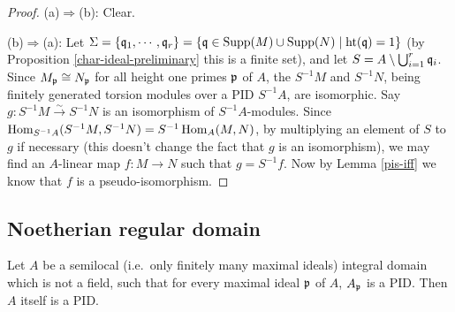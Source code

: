 \begin{proof}
(a)$\Rightarrow$(b): Clear.

(b)$\Rightarrow$(a): Let $\Sigma=\{{\mathfrak{q}}_1,\cdots,{\mathfrak{q}}_r\}
=\{{\mathfrak{q}}\in{\mathrm{Supp}}(M)\cup{\mathrm{Supp}}(N)\mid{\mathrm{ht}}({\mathfrak{q}})=1\}$
(by Proposition \ref{char-ideal-preliminary} this is a finite set),
and let $S=A\setminus\bigcup_{i=1}^r{\mathfrak{q}}_i$.
Since $M_{\mathfrak{p}}\cong N_{\mathfrak{p}}$ for all height one primes ${\mathfrak{p}}$ of $A$,
the $S^{-1}M$ and $S^{-1}N$, being finitely generated torsion modules over
a PID $S^{-1}A$, are isomorphic. Say $g:S^{-1}M\xrightarrow\sim S^{-1}N$
is an isomorphism of $S^{-1}A$-modules.
Since $\operatorname{Hom}_{S^{-1}A}(S^{-1}M,S^{-1}N)=S^{-1}\operatorname{Hom}_A(M,N)$,
by multiplying an element of $S$ to $g$ if necessary
(this doesn't change the fact that $g$ is an isomorphism), we may find
an $A$-linear map $f:M\to N$
such that $g=S^{-1}f$.
Now by Lemma \ref{pis-iff} we know that $f$ is a pseudo-isomorphism.
\end{proof}

\subsection{Noetherian regular domain}

\begin{lem}
\label{semilocal-PID}
Let $A$ be a semilocal (i.e.~only finitely many maximal ideals)
integral domain which is not a field,
such that for every maximal ideal ${\mathfrak{p}}$ of $A$, $A_{\mathfrak{p}}$ is a PID.
Then $A$ itself is a PID.
\end{lem}

